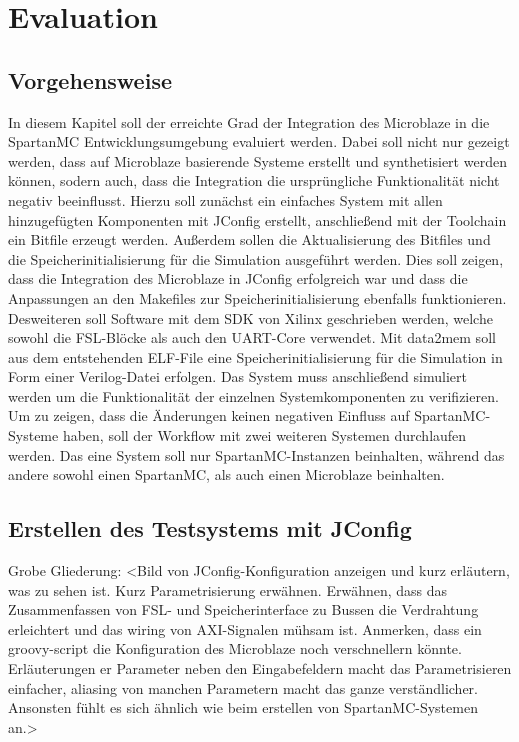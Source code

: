 \chapter{Evaluation}
\section{Vorgehensweise}
In diesem Kapitel soll der erreichte Grad der Integration des Microblaze in die SpartanMC Entwicklungsumgebung evaluiert werden. Dabei soll nicht nur gezeigt werden, dass auf Microblaze basierende Systeme erstellt und synthetisiert werden können, sodern auch, dass die Integration die ursprüngliche Funktionalität nicht negativ beeinflusst. Hierzu soll zunächst ein einfaches System mit allen hinzugefügten Komponenten mit JConfig erstellt, anschließend mit der Toolchain ein Bitfile erzeugt werden. Außerdem sollen die Aktualisierung des Bitfiles und die Speicherinitialisierung für die Simulation ausgeführt werden. Dies soll zeigen, dass die Integration des Microblaze in JConfig erfolgreich war und dass die Anpassungen an den Makefiles zur Speicherinitialisierung ebenfalls funktionieren.\\
Desweiteren soll Software mit dem SDK von Xilinx geschrieben werden, welche sowohl die FSL-Blöcke als auch den UART-Core verwendet. Mit data2mem soll aus dem entstehenden ELF-File eine Speicherinitialisierung für die Simulation in Form einer Verilog-Datei erfolgen. Das System muss anschließend simuliert werden um die Funktionalität der einzelnen Systemkomponenten zu verifizieren.\\
Um zu zeigen, dass die Änderungen keinen negativen Einfluss auf SpartanMC-Systeme haben, soll der Workflow mit zwei weiteren Systemen durchlaufen werden. Das eine System soll nur SpartanMC-Instanzen beinhalten, während das andere sowohl einen SpartanMC, als auch einen Microblaze beinhalten.
\section{Erstellen des Testsystems mit JConfig}
Grobe Gliederung:
<Bild von JConfig-Konfiguration anzeigen und kurz erläutern, was zu sehen ist. Kurz Parametrisierung erwähnen. Erwähnen, dass das Zusammenfassen von FSL- und Speicherinterface zu Bussen die Verdrahtung erleichtert und das wiring von AXI-Signalen mühsam ist. Anmerken, dass ein groovy-script die Konfiguration des Microblaze noch verschnellern könnte. Erläuterungen er Parameter neben den Eingabefeldern macht das Parametrisieren einfacher, aliasing von manchen Parametern macht das ganze verständlicher. Ansonsten fühlt es sich ähnlich wie beim erstellen von SpartanMC-Systemen an.>

